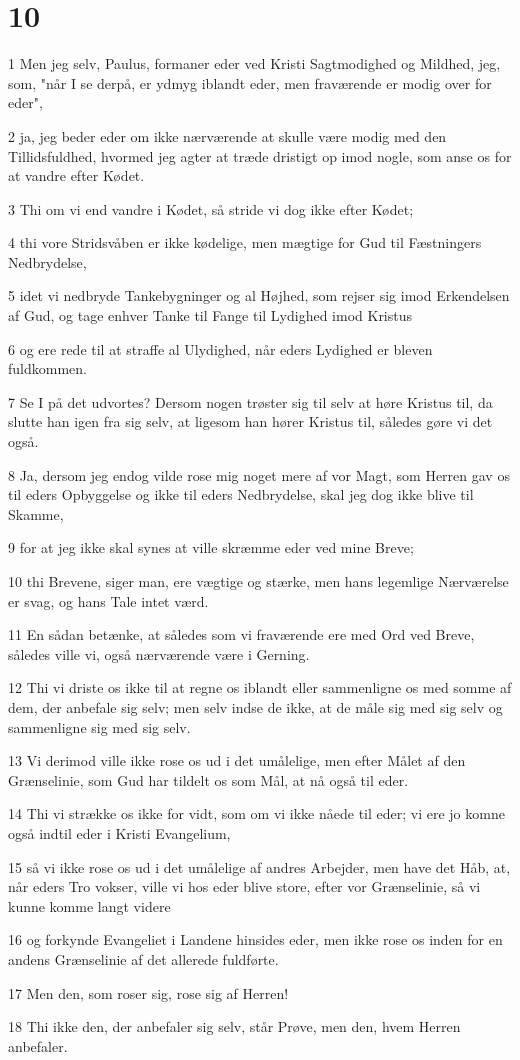 \chapter{10}

\par 1 Men jeg selv, Paulus, formaner eder ved Kristi Sagtmodighed og Mildhed, jeg, som, "når I se derpå, er ydmyg iblandt eder, men fraværende er modig over for eder",
\par 2 ja, jeg beder eder om ikke nærværende at skulle være modig med den Tillidsfuldhed, hvormed jeg agter at træde dristigt op imod nogle, som anse os for at vandre efter Kødet.
\par 3 Thi om vi end vandre i Kødet, så stride vi dog ikke efter Kødet;
\par 4 thi vore Stridsvåben er ikke kødelige, men mægtige for Gud til Fæstningers Nedbrydelse,
\par 5 idet vi nedbryde Tankebygninger og al Højhed, som rejser sig imod Erkendelsen af Gud, og tage enhver Tanke til Fange til Lydighed imod Kristus
\par 6 og ere rede til at straffe al Ulydighed, når eders Lydighed er bleven fuldkommen.
\par 7 Se I på det udvortes? Dersom nogen trøster sig til selv at høre Kristus til, da slutte han igen fra sig selv, at ligesom han hører Kristus til, således gøre vi det også.
\par 8 Ja, dersom jeg endog vilde rose mig noget mere af vor Magt, som Herren gav os til eders Opbyggelse og ikke til eders Nedbrydelse, skal jeg dog ikke blive til Skamme,
\par 9 for at jeg ikke skal synes at ville skræmme eder ved mine Breve;
\par 10 thi Brevene, siger man, ere vægtige og stærke, men hans legemlige Nærværelse er svag, og hans Tale intet værd.
\par 11 En sådan betænke, at således som vi fraværende ere med Ord ved Breve, således ville vi, også nærværende være i Gerning.
\par 12 Thi vi driste os ikke til at regne os iblandt eller sammenligne os med somme af dem, der anbefale sig selv; men selv indse de ikke, at de måle sig med sig selv og sammenligne sig med sig selv.
\par 13 Vi derimod ville ikke rose os ud i det umålelige, men efter Målet af den Grænselinie, som Gud har tildelt os som Mål, at nå også til eder.
\par 14 Thi vi strække os ikke for vidt, som om vi ikke nåede til eder; vi ere jo komne også indtil eder i Kristi Evangelium,
\par 15 så vi ikke rose os ud i det umålelige af andres Arbejder, men have det Håb, at, når eders Tro vokser, ville vi hos eder blive store, efter vor Grænselinie, så vi kunne komme langt videre
\par 16 og forkynde Evangeliet i Landene hinsides eder, men ikke rose os inden for en andens Grænselinie af det allerede fuldførte.
\par 17 Men den, som roser sig, rose sig af Herren!
\par 18 Thi ikke den, der anbefaler sig selv, står Prøve, men den, hvem Herren anbefaler.

